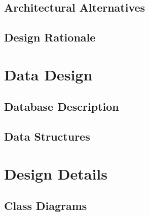 \documentclass[11pt, a4paper]{report}
\begin{document}
\section{Architectural Alternatives}


\section{Design Rationale}


\pagebreak


\chapter{Data Design}%
\label{cha:DD1}


\section{Database Description}


\section{Data Structures}


\pagebreak

\chapter{Design Details}%
\label{cha:DD2}


\section{Class Diagrams}
\end{document}
